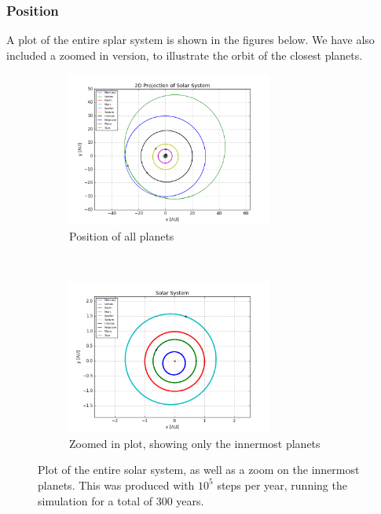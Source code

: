 \documentclass[a4paper, 10pt]{article}
\begin{document}
\subsubsection{Position}
A plot of the entire splar system is shown in the figures below. We have also included a zoomed in version, to illustrate the orbit of the closest planets.
\begin{figure}[t!]
    \centering
    \begin{subfigure}[t]{0.5\textwidth}
        \centering
        \includegraphics[height=2.0in]{orbitfull.png}
        \caption{Position of all planets}
    \end{subfigure}%
    ~ 
    \begin{subfigure}[t]{0.5\textwidth}
        \centering
        \includegraphics[height=2.0in]{orbitFull.png}
        \caption{Zoomed in plot, showing only the innermost planets}
    \end{subfigure}
    \caption{Plot of the entire solar system, as well as a zoom on the innermost planets. This was produced with $10^5$ steps per year, running the simulation for a total of 300 years.} \label{fig:solar_system}
\end{figure}
\end{document}
